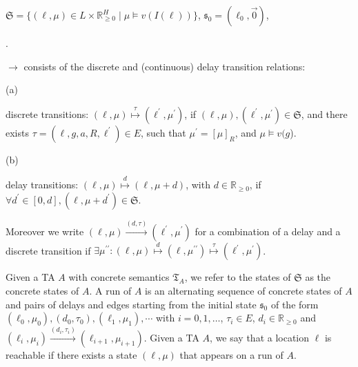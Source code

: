 \documentclass[10pt,a4paper]{article}
\begin{document}
$\mathfrak{S}=\big\{(\mathrm{\ell},\mu)\in L\times\mathbb{R}_{\geq 0}^{H}\mid\mu\models v(I(\mathrm{\ell}))\big\}$, $\mathfrak{s}_{0}=(\mathrm{\mathrm{\ell}_{0}},\vec{0})$,\par
 
 
 
\par{}. 
 
${\rightarrow}$ consists of the discrete and (continuous) delay transition relations:\par
  
\par\noindent  (a) 
 
discrete transitions: $(\mathrm{\ell},\mu)\stackrel{{\scriptstyle\tau}}{{\mapsto}}(\mathrm{\ell}^{\prime},\mu^{\prime})$, if $(\mathrm{\ell},\mu),(\mathrm{\ell}^{\prime},\mu^{\prime})\in\mathfrak{S}$, and there exists $\tau=(\mathrm{\ell},g,a,R,\mathrm{\ell}^{\prime})\in E$, such that $\mu^{\prime}=[\mu]_{R}$, and $\mu\models v(g$).\par
 
 
 
\par\noindent  (b) 
 
delay transitions: $(\mathrm{\ell},\mu)\stackrel{{\scriptstyle d}}{{\mapsto}}(\mathrm{\ell},\mu+d)$, with $d\in\mathbb{R}_{\geq 0}$, if $\forall d^{\prime}\in[0,d],(\mathrm{\ell},\mu+d^{\prime})\in\mathfrak{S}$.\par
 
 
  
 
  
 
 
 
Moreover we write $(\mathrm{\ell},\mu)\stackrel{{\scriptstyle(d,\tau)}}{{\longrightarrow}}(\mathrm{\ell}^{\prime},\mu^{\prime})$ for a combination of a delay and a discrete transition if $\exists\mu^{\prime\prime}:(\mathrm{\ell},\mu)\stackrel{{\scriptstyle d}}{{\mapsto}}(\mathrm{\ell},\mu^{\prime\prime})\stackrel{{\scriptstyle\tau}}{{\mapsto}}(\mathrm{\ell}^{\prime},\mu^{\prime})$.\par
 
 
 
Given a TA ${A}$ with concrete semantics $\mathfrak{T}_{{A}}$, we refer to the states of $\mathfrak{S}$ as the concrete states of ${A}$. A run of ${A}$ is an alternating sequence of concrete states of ${A}$ and pairs of delays and edges starting from the initial state $\mathfrak{s}_{0}$ of the form $(\mathrm{\mathrm{\ell}}_{0},\mu_{0}),(d_{0},\tau_{0}),(\mathrm{\mathrm{\ell}}_{1},\mu_{1}),\cdots$ with $i=0,1,\dots$, $\tau_{i}\in E$, $d_{i}\in\mathbb{R}_{\geq 0}$ and $(\mathrm{\mathrm{\ell}}_{i},\mu_{i})\stackrel{{\scriptstyle(d_{i},\tau_{i})}}{{\longrightarrow}}(\mathrm{\mathrm{\ell}}_{i+1},\mu_{i+1})$. Given a TA ${A}$, we say that a location $\mathrm{\ell}$ is reachable if there exists a state $(\mathrm{\ell},\mu)$ that appears on a run of ${A}$.\par
 
\end{document}
